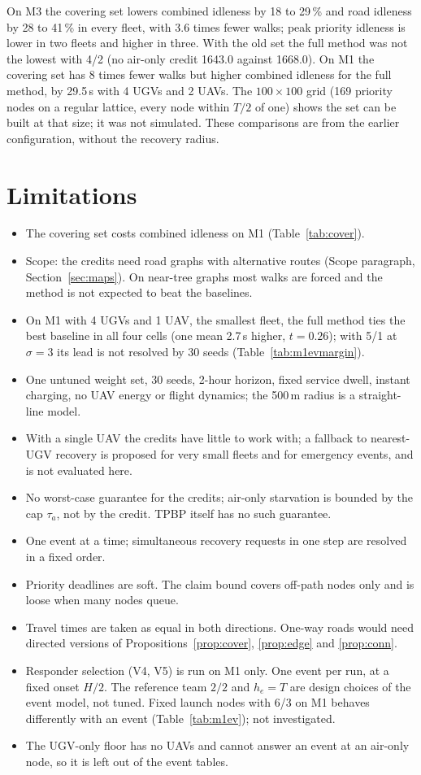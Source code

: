 \documentclass[11pt]{article}
\theoremstyle{definition}
\theoremstyle{plain}
\begin{document}
On M3 the covering set lowers combined idleness by 18 to 29\,\% and road
idleness by 28 to 41\,\% in every fleet, with 3.6 times fewer walks; peak
priority idleness is lower in two fleets and higher in three. With the old
set the full method was not the lowest with 4/2 (no air-only credit 1643.0
against 1668.0). On M1 the covering set has 8 times fewer walks but higher
combined idleness for the full method, by 29.5\,s with 4 UGVs and 2 UAVs.
The $100 \times 100$ grid (169 priority nodes on a regular lattice, every
node within $T/2$ of one) shows the set can be built at that size; it was
not simulated. These comparisons are from the earlier configuration, without
the recovery radius.

\section{Limitations}
\begin{itemize}
\item The covering set costs combined idleness on M1
(Table~\ref{tab:cover}).
\item Scope: the credits need road graphs with alternative routes
(Scope paragraph, Section~\ref{sec:maps}). On near-tree graphs most walks are forced
and the method is not expected to beat the baselines.
\item On M1 with 4 UGVs and 1 UAV, the smallest fleet, the full method ties
the best baseline in all four cells (one mean 2.7\,s higher, $t = 0.26$);
with 5/1 at $\sigma = 3$ its lead is not resolved by 30 seeds
(Table~\ref{tab:m1evmargin}).
\item One untuned weight set, 30 seeds, 2-hour horizon, fixed
service dwell, instant charging, no UAV energy or flight dynamics; the
500\,m radius is a straight-line model.
\item With a single UAV the credits have little to work with; a fallback to
nearest-UGV recovery is proposed for very small fleets and for emergency
events, and is not evaluated here.
\item No worst-case guarantee for the credits; air-only starvation is
bounded by the cap $\tau_a$, not by the credit. TPBP itself has no such
guarantee.
\item One event at a time; simultaneous recovery requests in one step are
resolved in a fixed order.
\item Priority deadlines are soft. The claim bound covers off-path nodes
only and is loose when many nodes queue.
\item Travel times are taken as equal in both directions. One-way roads
would need directed versions of Propositions~\ref{prop:cover},
\ref{prop:edge} and \ref{prop:conn}.
\item Responder selection (V4, V5) is run on M1 only. One event per
run, at a fixed onset $H/2$. The reference team $2/2$ and $h_e = T$ are
design choices of the event model, not tuned. Fixed launch nodes with 6/3
on M1 behaves differently with an event (Table~\ref{tab:m1ev}); not
investigated.
\item The UGV-only floor has no UAVs and cannot answer an event at an
air-only node, so it is left out of the event tables.
\end{itemize}
\end{document}

